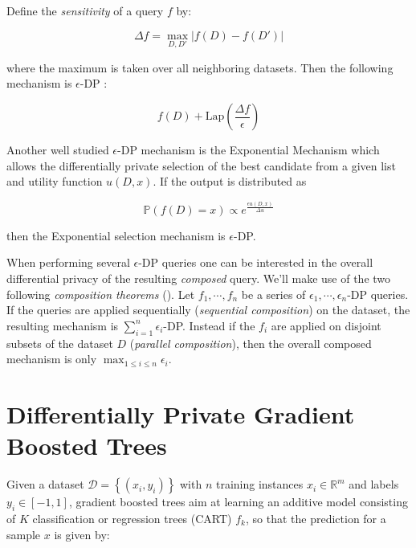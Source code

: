 \documentclass{article}
\theoremstyle{definition}
\begin{document}
Define the \textit{sensitivity} of a query $f$ by: 

\begin{equation*}
  \Delta f = \max_{D, D'} \vert f(D) - f(D') \vert 
\end{equation*}

where the maximum is taken over all neighboring datasets. Then the following mechanism is $\epsilon$-DP \cite{dwork2014}:

\begin{equation*}
  f(D) + \text{Lap}\left( \frac{\Delta f}{\epsilon} \right) 
\end{equation*}

Another well studied $\epsilon$-DP mechanism is the Exponential Mechanism \cite{mcsherry2007mechanism} which allows the differentially private 
selection of the best candidate from a given list and utility function $u(D, x)$. If the output is distributed as  

\begin{equation*} 
\mathbb{P}(f(D) = x) \propto e^{ \frac{\epsilon u(D,x)}{\Delta u} }
\end{equation*}

then the Exponential selection mechanism is $\epsilon$-DP. 

When performing several $\epsilon$-DP queries one can be interested in the overall differential privacy 
of the resulting \textit{composed} query. We'll make use of the two following \textit{composition theorems} (\cite{dwork2014}). 
Let $f_1, \cdots, f_n$ be a series of $\epsilon_1, \cdots, \epsilon_n$-DP queries. If the queries are applied sequentially (\textit{sequential composition}) on the dataset, the resulting mechanism 
is $\sum_{i=1}^{n} \epsilon_i$-DP. Instead if the $f_i$ are applied on disjoint subsets of the dataset $D$ (\textit{parallel composition}), then the overall composed mechanism is only $\max_{1 \leq i \leq n} \epsilon_i$. 


\section{Differentially Private Gradient Boosted Trees} 

Given a dataset $\mathcal{D} = \left\{ (x_i, y_i ) \right\}$ with $n$ training instances 
$x_i \in \mathbb{R}^m$ and labels $y_i \in [-1, 1]$, gradient boosted trees aim at learning an additive
model consisting of $K$ classification or regression trees (CART) $f_k$, so that the prediction for a sample $x$ is given by:
\end{document}
